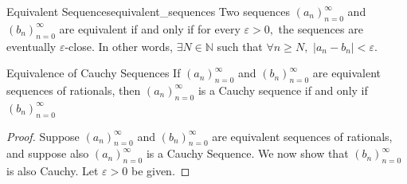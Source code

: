 \begin{definition}{Equivalent Sequences}{equivalent_sequences}
    Two sequences $(a_n)_{n=0}^\infty$ and $( b_n)_{n=0}^\infty$ are equivalent 
    if and only if for every $\varepsilon > 0,$ the sequences are eventually $\varepsilon$-close.
    In other words, $\exists N \in \mathbb{N}$ such that $\forall n \geq N,$ $\lvert a_n - b_n \rvert < \varepsilon.$
\end{definition}

\begin{problem}{Equivalence of Cauchy Sequences}
    If $(a_n)_{n=0}^\infty$ and $( b_n)_{n=0}^\infty$ are equivalent sequences of rationals, then $(a_n)_{n=0}^\infty$ is a Cauchy sequence if and only if $(b_n)_{n=0}^\infty$
\end{problem}

\begin{proof}
    Suppose $(a_n)_{n=0}^\infty$ and $( b_n)_{n=0}^\infty$ are equivalent sequences of rationals, and suppose also $(a_n)_{n=0}^\infty$ is a Cauchy Sequence.
    We now show that $(b_n)_{n=0}^\infty$ is also Cauchy. 
    Let $\varepsilon > 0$ be given.


\end{proof}
